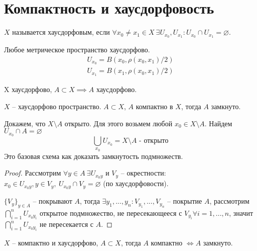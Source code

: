 \documentclass[main]{subfiles}
\begin{document}
\section{Компактность и хаусдорфовость}
\begin{axiom}[Хаусдорфа]
    $X$ называется хаусдорфовым, если $\forall x_0 \neq x_1 \in X\ \exists U_{x_0}, U_{x_1} : U_{x_0} \cap U_{x_1} = \varnothing$.
\end{axiom}
\begin{example}
    Любое метрическое пространство хаусдорфово.
    \begin{gather*}
        U_{x_0} = B(x_0, \rho(x_0, x_1) /2)\\
        U_{x_1} = B(x_1, \rho(x_0, x_1) /2)
    \end{gather*}
\end{example}
\begin{remark}
    X хаусдорфово, $A \subset X \implies A$ хаусдорфово.
\end{remark}

\begin{theorem}\label{compact:4}
    $X$ -- хаусдорфово пространство. $A \subset X$, $A$ компактно в $X$, тогда $A$ замкнуто.
\end{theorem}
\begin{remark}
    Докажем, что $X \setminus A$ открыто.
    Для этого возьмем любой $x_0 \in X \setminus A$. Найдем $U_{x_0} \cap A = \varnothing$
    \[\bigcup_{x_0} U_{x_0}= X \setminus A \text{ - открыто}\]
    Это базовая схема как доказать замкнутость подмножеств.
\end{remark}
\begin{proof}
    Рассмотрим $\forall y \in A \ \exists U_{x_0 y}$ и $V_y$ -- окрестности:
    $x_0 \in U_{x_0y}, y \in V_y, \ U_{x_0y} \cap V_y = \varnothing$ (по хаусдорфовости).

    $\{V_y\}_{y \in A}$ -- покрывают $A$, тогда $\exists y_1, ..., y_n: V_{y_1}, ..., V_{y_n}$ -- покрытие $A$,
    рассмотрим $\bigcap_{i=1}^n U_{x_0 y_i}$ открытое подмножество, не пересекающееся с $V_{y_i} \forall i = 1, ..., n$,
    значит $\bigcap_{i = 1}^n U_{x_0y_i}$ не пересекается с $A$.
\end{proof}

\begin{corollary}
    $X$ -- компактно и хаусдорфово, $A \subset X$, тогда $A$ компактно $\Leftrightarrow A$ замкнуто.
\end{corollary}
\end{document}
